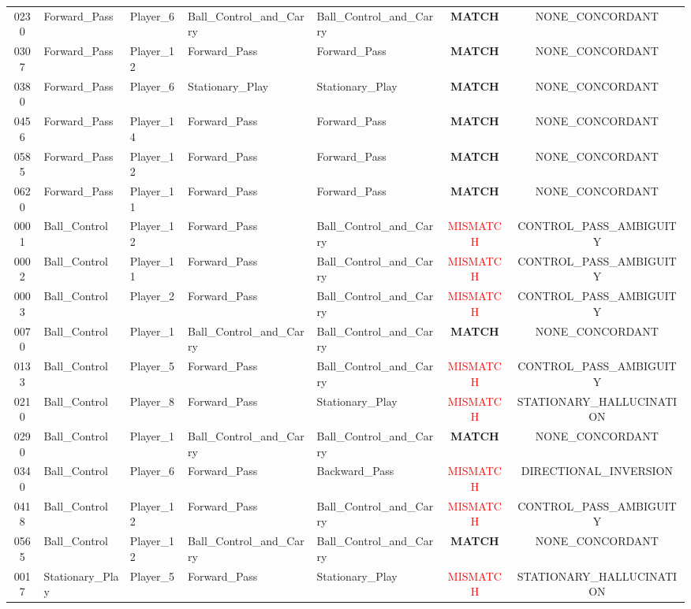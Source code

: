 \begin{table}[t]
\begin{tabular}{cllllcc}
0230 & Forward\_Pass & Player_6 & Ball\_Control\_and\_Carry & Ball\_Control\_and\_Carry & \textbf{MATCH} & NONE\_CONCORDANT \\
0307 & Forward\_Pass & Player_12 & Forward\_Pass & Forward\_Pass & \textbf{MATCH} & NONE\_CONCORDANT \\
0380 & Forward\_Pass & Player_6 & Stationary\_Play & Stationary\_Play & \textbf{MATCH} & NONE\_CONCORDANT \\
0456 & Forward\_Pass & Player_14 & Forward\_Pass & Forward\_Pass & \textbf{MATCH} & NONE\_CONCORDANT \\
0585 & Forward\_Pass & Player_12 & Forward\_Pass & Forward\_Pass & \textbf{MATCH} & NONE\_CONCORDANT \\
0620 & Forward\_Pass & Player_11 & Forward\_Pass & Forward\_Pass & \textbf{MATCH} & NONE\_CONCORDANT \\
0001 & Ball\_Control & Player_12 & Forward\_Pass & Ball\_Control\_and\_Carry & \textcolor{red}{MISMATCH} & CONTROL\_PASS\_AMBIGUITY \\
0002 & Ball\_Control & Player_11 & Forward\_Pass & Ball\_Control\_and\_Carry & \textcolor{red}{MISMATCH} & CONTROL\_PASS\_AMBIGUITY \\
0003 & Ball\_Control & Player_2 & Forward\_Pass & Ball\_Control\_and\_Carry & \textcolor{red}{MISMATCH} & CONTROL\_PASS\_AMBIGUITY \\
0070 & Ball\_Control & Player_1 & Ball\_Control\_and\_Carry & Ball\_Control\_and\_Carry & \textbf{MATCH} & NONE\_CONCORDANT \\
0133 & Ball\_Control & Player_5 & Forward\_Pass & Ball\_Control\_and\_Carry & \textcolor{red}{MISMATCH} & CONTROL\_PASS\_AMBIGUITY \\
0210 & Ball\_Control & Player_8 & Forward\_Pass & Stationary\_Play & \textcolor{red}{MISMATCH} & STATIONARY\_HALLUCINATION \\
0290 & Ball\_Control & Player_1 & Ball\_Control\_and\_Carry & Ball\_Control\_and\_Carry & \textbf{MATCH} & NONE\_CONCORDANT \\
0340 & Ball\_Control & Player_6 & Forward\_Pass & Backward\_Pass & \textcolor{red}{MISMATCH} & DIRECTIONAL\_INVERSION \\
0418 & Ball\_Control & Player_12 & Forward\_Pass & Ball\_Control\_and\_Carry & \textcolor{red}{MISMATCH} & CONTROL\_PASS\_AMBIGUITY \\
0565 & Ball\_Control & Player_12 & Ball\_Control\_and\_Carry & Ball\_Control\_and\_Carry & \textbf{MATCH} & NONE\_CONCORDANT \\
0017 & Stationary\_Play & Player_5 & Forward\_Pass & Stationary\_Play & \textcolor{red}{MISMATCH} & STATIONARY\_HALLUCINATION \\

\end{tabular}
\end{table}
